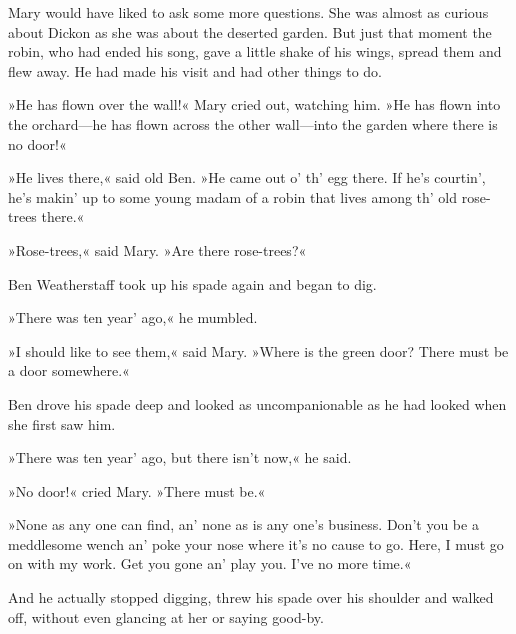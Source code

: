 Mary would have liked to ask some more questions. She was almost as curious about Dickon as she was about the deserted garden. But just that moment the robin, who had ended his song, gave a little shake of his wings, spread them and flew away. He had made his visit and had other things to do.

»He has flown over the wall!« Mary cried out, watching him. »He has flown into the orchard—he has flown across the other wall—into the garden where there is no door!«

»He lives there,« said old Ben. »He came out o' th' egg there. If he's courtin', he's makin' up to some young madam of a robin that lives among th' old rose-trees there.«

»Rose-trees,« said Mary. »Are there rose-trees?«

Ben Weatherstaff took up his spade again and began to dig.

»There was ten year' ago,« he mumbled.

»I should like to see them,« said Mary. »Where is the green door? There must be a door somewhere.«

Ben drove his spade deep and looked as uncompanionable as he had looked when she first saw him.

»There was ten year' ago, but there isn't now,« he said.

»No door!« cried Mary. »There must be.«

»None as any one can find, an' none as is any one's business. Don't you be a meddlesome wench an' poke your nose where it's no cause to go. Here, I must go on with my work. Get you gone an' play you. I've no more time.«

And he actually stopped digging, threw his spade over his shoulder and walked off, without even glancing at her or saying good-by.